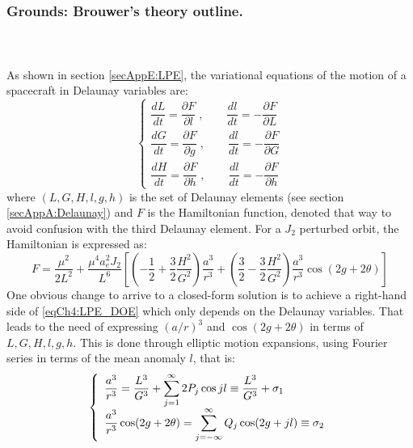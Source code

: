 		\subsubsection{Grounds: Brouwer's theory outline.}
		\paragraph{  \\}
		\indent As shown in section \ref{secAppE:LPE}, the variational equations of the motion of a spacecraft in Delaunay variables are:
		\begin{equation}
		\left\{ \begin{array}{ccc}
		\dfrac{dL}{dt} = \dfrac{\partial F}{\partial l}\; , \qquad \dfrac{dl}{dt} = - \dfrac{\partial F}{\partial L} \\[1.2em]
		\dfrac{dG}{dt} = \dfrac{\partial F}{\partial g}\; , \qquad \dfrac{dl}{dt} = - \dfrac{\partial F}{\partial G} \\[1.2em]
		\dfrac{dH}{dt} = \dfrac{\partial F}{\partial h}\; , \qquad \dfrac{dl}{dt} = - \dfrac{\partial F}{\partial h}
		\end{array}\right. 
		\label{eqCh4:LPE_DOE}
		\end{equation}
		\noindent where $(L, G, H, l, g, h)$ is the set of Delaunay elements (see section \ref{secAppA:Delaunay}) and $F$ is the Hamiltonian function, denoted that way to avoid confusion with the third Delaunay element. For a $J_2$ perturbed orbit, the Hamiltonian is expressed as:
		\begin{equation}
		F = \dfrac{\mu^2}{2L^2} + \dfrac{\mu^4 a_e^2 J_2}{L^6} \left[ \left(-\dfrac{1}{2} + \dfrac{3}{2} \dfrac{H^2}{G^2}\right) \dfrac{a^3}{r^3} + \left( \dfrac{3}{2} - \dfrac{3}{2} \dfrac{H^2}{G^2}\right) \dfrac{a^3}{r^3} \cos(2g + 2\theta)\right]
		\end{equation}
		\indent One obvious change to arrive to a closed-form solution is to achieve a right-hand side of \eqref{eqCh4:LPE_DOE} which only depends on the Delaunay variables. That leads to the need of expressing $(a/r)^3$ and $\cos (2g+ 2\theta)$ in terms of $L, G, H, l, g, h$. This is done through elliptic motion expansions, using Fourier series in terms of the mean anomaly $l$, that is:
		\[
		\left\{ \begin{array}{ll}
		\dfrac{a^3}{r^3} = \dfrac{L^3}{G^3} + \displaystyle\sum_{j = 1}^{\infty} 2 P_j \cos jl \equiv \dfrac{L^3}{G^3} + \sigma_1 \\
		\dfrac{a^3}{r^3} \cos(2g + 2\theta) = \displaystyle\sum_{j = -\infty}^{\infty} Q_j \cos(2g + jl)  \equiv \sigma_2 
		\end{array}\right.
		\]
